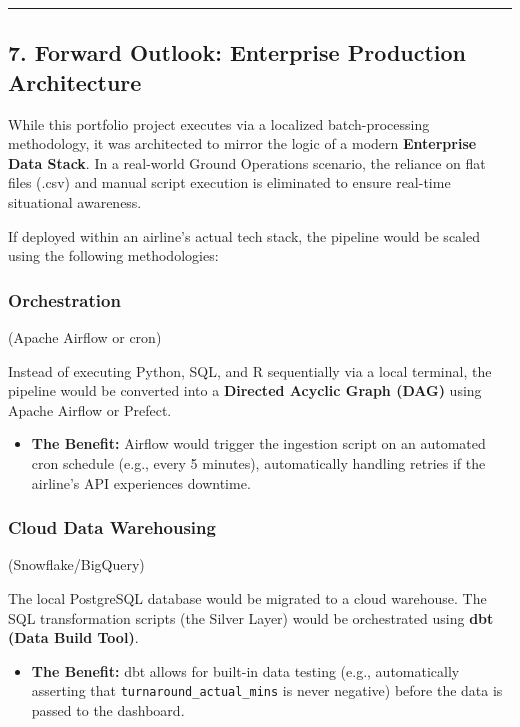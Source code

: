 \documentclass[
  letterpaper,
  DIV=11,
  numbers=noendperiod]{scrartcl}
\providecommand{\tightlist}{%
  \setlength{\itemsep}{0pt}\setlength{\parskip}{0pt}}
\begin{document}
\begin{center}\rule{0.5\linewidth}{0.5pt}\end{center}

\subsection{7. Forward Outlook: Enterprise Production
Architecture}\label{forward-outlook-enterprise-production-architecture}

While this portfolio project executes via a localized batch-processing
methodology, it was architected to mirror the logic of a modern
\textbf{Enterprise Data Stack}. In a real-world Ground Operations
scenario, the reliance on flat files (.csv) and manual script execution
is eliminated to ensure real-time situational awareness.

If deployed within an airline's actual tech stack, the pipeline would be
scaled using the following methodologies:

\subsubsection{Orchestration}

(Apache Airflow or cron)

Instead of executing Python, SQL, and R sequentially via a local
terminal, the pipeline would be converted into a \textbf{Directed
Acyclic Graph (DAG)} using Apache Airflow or Prefect.

\begin{itemize}
\tightlist
\item
  \textbf{The Benefit:} Airflow would trigger the ingestion script on an
  automated cron schedule (e.g., every 5 minutes), automatically
  handling retries if the airline's API experiences downtime.
\end{itemize}

\subsubsection{Cloud Data Warehousing}

(Snowflake/BigQuery)

The local PostgreSQL database would be migrated to a cloud warehouse.
The SQL transformation scripts (the Silver Layer) would be orchestrated
using \textbf{dbt (Data Build Tool)}.

\begin{itemize}
\tightlist
\item
  \textbf{The Benefit:} dbt allows for built-in data testing (e.g.,
  automatically asserting that \texttt{turnaround\_actual\_mins} is
  never negative) before the data is passed to the dashboard.
\end{itemize}
\end{document}
